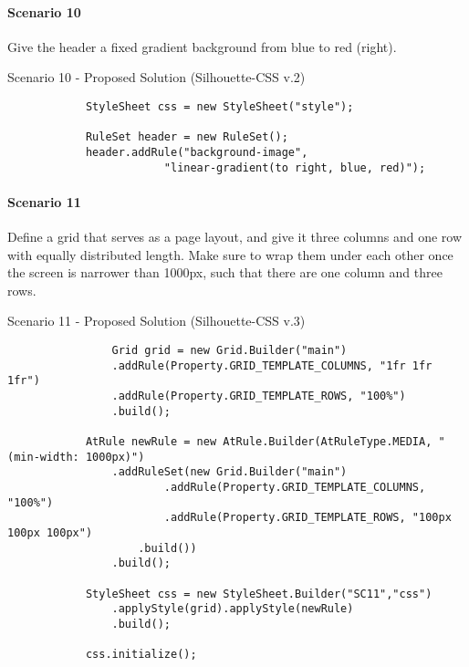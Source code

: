 \documentclass[12pt]{article}
\begin{document}
        \paragraph{Scenario 10}
        Give the header a fixed gradient background from blue to red (right).

        \begin{shaded}
        Scenario 10 - Proposed Solution (Silhouette-CSS v.2)
            \begin{lstlisting}
            StyleSheet css = new StyleSheet("style");

            RuleSet header = new RuleSet();
            header.addRule("background-image",
                        "linear-gradient(to right, blue, red)");
            \end{lstlisting}
        \end{shaded}

        \paragraph{Scenario 11}
        Define a grid that serves as a page layout, and give it three columns and one row with equally distributed length. Make sure to wrap them under each other once the screen is narrower than 1000px, such that there are one column and three rows.

        \begin{shaded}
            Scenario 11 - Proposed Solution (Silhouette-CSS v.3)
            \begin{lstlisting}
                Grid grid = new Grid.Builder("main")
                .addRule(Property.GRID_TEMPLATE_COLUMNS, "1fr 1fr 1fr")
                .addRule(Property.GRID_TEMPLATE_ROWS, "100%")
                .build();

            AtRule newRule = new AtRule.Builder(AtRuleType.MEDIA, "(min-width: 1000px)")
                .addRuleSet(new Grid.Builder("main")
                        .addRule(Property.GRID_TEMPLATE_COLUMNS, "100%")
                        .addRule(Property.GRID_TEMPLATE_ROWS, "100px 100px 100px")
                    .build())
                .build();

            StyleSheet css = new StyleSheet.Builder("SC11","css")
                .applyStyle(grid).applyStyle(newRule)
                .build();

            css.initialize();
            \end{lstlisting}
        \end{shaded}
\end{document}
